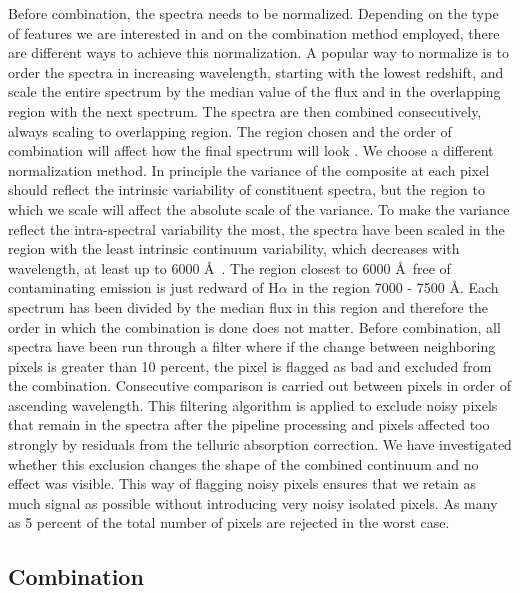 \documentclass{aa}    %
\newcommand{\sectlabel}[1]{\label{sect:#1}}
\begin{document}
Before combination, the spectra needs to be normalized. Depending on the type of features we are interested in and
on the combination method employed, there are different ways to
achieve this normalization. A popular way to normalize is to order the
spectra in increasing wavelength, starting with the lowest redshift,
and scale the entire spectrum by the median value of the flux and in
the overlapping region with the next spectrum. The spectra are then
combined consecutively, always scaling to overlapping region. The
region chosen and the order of combination will affect how the final
spectrum will look
\citep{Francis1991,Brotherton2000,VandenBerk2001,Glikman2006}. We
choose a different normalization method. In principle the variance of
the composite at each pixel should reflect the intrinsic variability of constituent
spectra, but the region to which we scale will affect the absolute
scale of the variance. To make the variance reflect the intra-spectral
variability the most, the spectra have been scaled in the region with
the least intrinsic continuum variability, which decreases with
wavelength, at least up to 6000 \AA~\citep{VandenBerk2004}. The
region closest to 6000 \AA~free of contaminating emission is just
redward of H$\alpha$ in the region 7000 - 7500 \AA. Each spectrum has
been divided by the median flux in this region and therefore the order in which the combination is done does not
matter. Before combination, all spectra have been run
through a filter where if the change between neighboring pixels is greater
than 10 percent, the pixel is flagged as bad and excluded from the
combination. Consecutive comparison is carried out between pixels in order of ascending wavelength. This filtering algorithm is applied to exclude noisy pixels that remain in the spectra after the pipeline processing and pixels affected too
strongly by residuals from the telluric absorption correction. We have investigated
whether this exclusion changes the shape of the combined continuum and
no effect was visible. This way of flagging noisy pixels ensures that
we retain as much signal as possible without introducing very noisy
isolated pixels. As many as 5 percent of the total number of pixels are
rejected in the worst case.


\subsection{Combination}  \sectlabel{combine}
\end{document}
